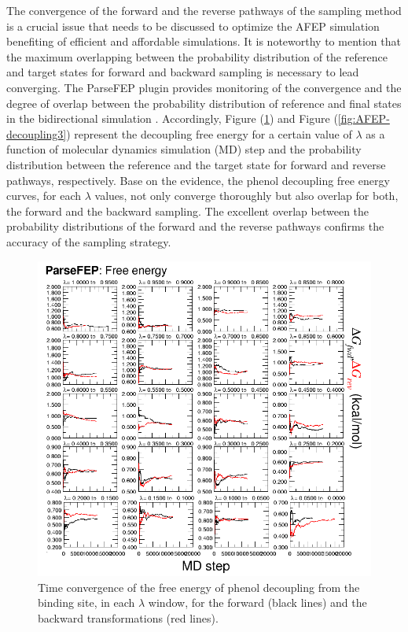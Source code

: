 \documentclass[9pt,tutorial]{livecoms}
\begin{document}
The convergence of the forward and the reverse pathways of the sampling method is a crucial issue that needs to be discussed to optimize the AFEP simulation benefiting of efficient and affordable simulations. It is noteworthy to mention that the maximum overlapping between the probability distribution of the reference and target states for forward and backward sampling is necessary to lead converging. The ParseFEP plugin provides monitoring of the convergence and the degree of overlap between the probability distribution of reference and final states in the bidirectional simulation \cite{Liu2012}. Accordingly, Figure (\ref{fig:AFEP-decoupling2}) and Figure (\ref{fig:AFEP-decoupling3}) represent the decoupling free energy for a certain value of {$\lambda$} as a function of molecular dynamics simulation (MD) step and the probability distribution between the reference and the target state for forward and reverse pathways, respectively. Base on the evidence, the phenol decoupling free energy curves, for each {$\lambda$} values, not only converge thoroughly but also overlap for both, the forward and the backward sampling. The excellent overlap between the probability distributions of the forward and the reverse pathways confirms the accuracy of the sampling strategy.

\begin{figure}[h!t]
\centering
\includegraphics[width=0.6\linewidth]{AFEP-decoupling-lambda}
\caption{Time convergence of the free energy of phenol decoupling from the binding site, in each $\lambda$ window, for the forward (black lines) and the backward transformations (red lines).}
\label{fig:AFEP-decoupling2}
\end{figure}
\end{document}
